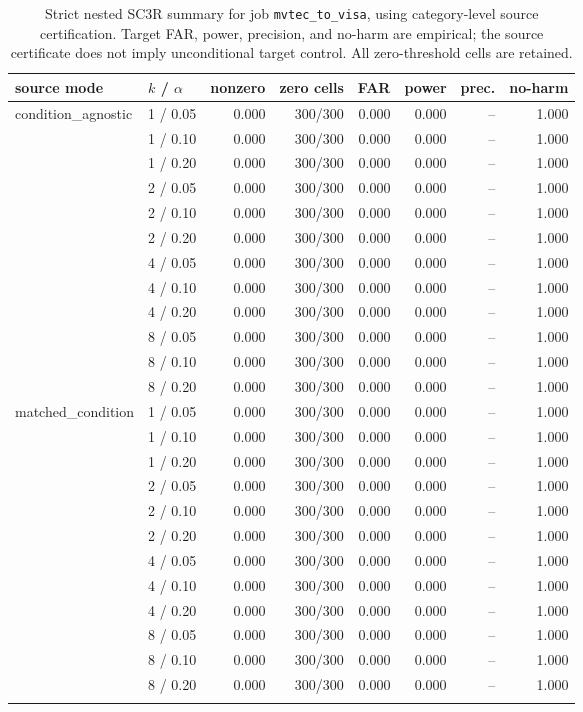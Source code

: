 \begin{table}[t]
\centering
\caption{Strict nested SC3R summary for job \texttt{mvtec\_to\_visa}, using category-level source certification. Target FAR, power, precision, and no-harm are empirical; the source certificate does not imply unconditional target control. All zero-threshold cells are retained.}
\label{tab:nested-sc3r-mvtec-to-visa}
\footnotesize
\setlength{\tabcolsep}{4pt}
\begin{tabular}{llrrrrrr}
\toprule
source mode & $k$ / $\alpha$ & nonzero & zero cells & FAR & power & prec. & no-harm \\
\midrule
condition\_agnostic & 1 / 0.05 & 0.000 & 300/300 & 0.000 & 0.000 & -- & 1.000 \\
 & 1 / 0.10 & 0.000 & 300/300 & 0.000 & 0.000 & -- & 1.000 \\
 & 1 / 0.20 & 0.000 & 300/300 & 0.000 & 0.000 & -- & 1.000 \\
 & 2 / 0.05 & 0.000 & 300/300 & 0.000 & 0.000 & -- & 1.000 \\
 & 2 / 0.10 & 0.000 & 300/300 & 0.000 & 0.000 & -- & 1.000 \\
 & 2 / 0.20 & 0.000 & 300/300 & 0.000 & 0.000 & -- & 1.000 \\
 & 4 / 0.05 & 0.000 & 300/300 & 0.000 & 0.000 & -- & 1.000 \\
 & 4 / 0.10 & 0.000 & 300/300 & 0.000 & 0.000 & -- & 1.000 \\
 & 4 / 0.20 & 0.000 & 300/300 & 0.000 & 0.000 & -- & 1.000 \\
 & 8 / 0.05 & 0.000 & 300/300 & 0.000 & 0.000 & -- & 1.000 \\
 & 8 / 0.10 & 0.000 & 300/300 & 0.000 & 0.000 & -- & 1.000 \\
 & 8 / 0.20 & 0.000 & 300/300 & 0.000 & 0.000 & -- & 1.000 \\
\addlinespace[2pt]
matched\_condition & 1 / 0.05 & 0.000 & 300/300 & 0.000 & 0.000 & -- & 1.000 \\
 & 1 / 0.10 & 0.000 & 300/300 & 0.000 & 0.000 & -- & 1.000 \\
 & 1 / 0.20 & 0.000 & 300/300 & 0.000 & 0.000 & -- & 1.000 \\
 & 2 / 0.05 & 0.000 & 300/300 & 0.000 & 0.000 & -- & 1.000 \\
 & 2 / 0.10 & 0.000 & 300/300 & 0.000 & 0.000 & -- & 1.000 \\
 & 2 / 0.20 & 0.000 & 300/300 & 0.000 & 0.000 & -- & 1.000 \\
 & 4 / 0.05 & 0.000 & 300/300 & 0.000 & 0.000 & -- & 1.000 \\
 & 4 / 0.10 & 0.000 & 300/300 & 0.000 & 0.000 & -- & 1.000 \\
 & 4 / 0.20 & 0.000 & 300/300 & 0.000 & 0.000 & -- & 1.000 \\
 & 8 / 0.05 & 0.000 & 300/300 & 0.000 & 0.000 & -- & 1.000 \\
 & 8 / 0.10 & 0.000 & 300/300 & 0.000 & 0.000 & -- & 1.000 \\
 & 8 / 0.20 & 0.000 & 300/300 & 0.000 & 0.000 & -- & 1.000 \\
\addlinespace[2pt]
\bottomrule
\end{tabular}
\end{table}
